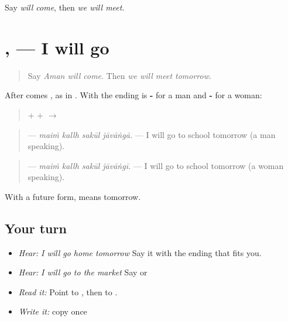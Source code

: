\begin{tcolorbox}[breakable,colback=teal!4,colframe=teal!35!black,title={Before you move on}]
Say \emph{will come}, then \emph{we will meet}.
\end{tcolorbox}
\section[\texorpdfstring{\pa{ਜਾਵਾਂਗਾ} · \pa{ਜਾਵਾਂਗੀ} (jāvāṅgā · jāvāṅgī)}{ਜਾਵਾਂਗਾ · ਜਾਵਾਂਗੀ (jāvāṅgā · jāvāṅgī)}]{,  — I will go}

\label{lesson:PA-C221-javanga}



\begin{quote}
Say \emph{Aman will come}. Then \emph{we will meet tomorrow}.
\end{quote}

\begin{grammarlens}[title={Grammar Lens: \pa{ਮੈਂ} in the future}]
After \textbf{} comes \textbf{}, as in \textbf{}. With \textbf{} the ending is \textbf{-} for a man and \textbf{-} for a woman:

\begin{quote}
\textbf{} + \textbf{} + \textbf{} $\to$ \textbf{}
\end{quote}

\begin{quote}
\textbf{   } — \emph{maiṁ kallh sakūl jāvāṅgā.} — I will go to school tomorrow (a man speaking).
\end{quote}

\begin{quote}
\textbf{   } — \emph{maiṁ kallh sakūl jāvāṅgī.} — I will go to school tomorrow (a woman speaking).
\end{quote}

With a future form, \textbf{} means tomorrow.
\end{grammarlens}

\subsection*{Your turn}
\begin{itemize}
\raggedright
  \item \emph{Hear:} \emph{I will go home tomorrow} Say it with the ending that fits you.
  \item \emph{Hear:} \emph{I will go to the market} Say \textbf{  } or \textbf{  }
  \item \emph{Read it:} \textbf{} Point to \textbf{}, then to \textbf{}.
  \item \emph{Write it:} copy \textbf{} once
\end{itemize}

